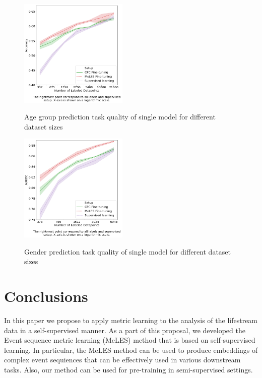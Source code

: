 \documentclass[sigconf, anonymous]{acmart}
\begin{document}
\begin{figure}[ht]
  \caption{Age group prediction task quality of single model for different dataset sizes}
  \includegraphics[width=0.46\textwidth]{figures/ss_age_1_wopl.png}
  \label{fig-semi-age-1}
\end{figure}

\begin{figure}[ht]
  \caption{Gender prediction task quality of single model for different dataset sizes}
  \includegraphics[width=0.46\textwidth]{figures/ss_gen_1.png}
  \label{fig-semi-gender-1}
\end{figure}

\section{Conclusions} \label{sec-conclusions}

In this paper we propose to apply metric learning to the analysis of the lifestream data in a self-supervised manner. As a part of this proposal, we developed the Event sequence metric learning (MeLES) method that is based on self-supervised learning. 
In particular, the MeLES method can be used to produce embeddings of complex event sequiences that can be effectively used in various downstream tasks. Also, our method can be used for pre-training in semi-supervised settings.
\end{document}
